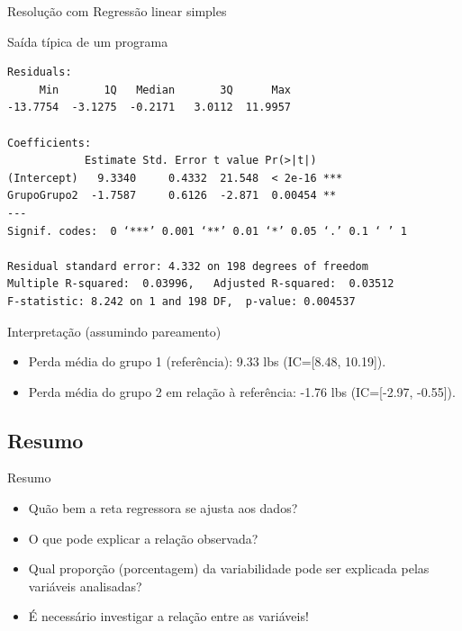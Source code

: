 \documentclass{beamer}
\begin{document}
\begin{frame}[fragile]{\small Resolução com Regressão linear simples}
  \begin{exampleblock}{Saída típica de um programa}
    \tiny
\begin{verbatim}
Residuals:
     Min       1Q   Median       3Q      Max 
-13.7754  -3.1275  -0.2171   3.0112  11.9957 

Coefficients:
            Estimate Std. Error t value Pr(>|t|)    
(Intercept)   9.3340     0.4332  21.548  < 2e-16 ***
GrupoGrupo2  -1.7587     0.6126  -2.871  0.00454 ** 
---
Signif. codes:  0 ‘***’ 0.001 ‘**’ 0.01 ‘*’ 0.05 ‘.’ 0.1 ‘ ’ 1

Residual standard error: 4.332 on 198 degrees of freedom
Multiple R-squared:  0.03996,	Adjusted R-squared:  0.03512 
F-statistic: 8.242 on 1 and 198 DF,  p-value: 0.004537
\end{verbatim}
  \end{exampleblock}
  \begin{exampleblock}{\small Interpretação (assumindo pareamento)}
    \begin{itemize}
      \scriptsize
    \item Perda média do grupo 1 (referência): 9.33 lbs {\tiny (IC=[8.48, 10.19])}.
    \item Perda média do grupo 2 em relação à referência: -1.76 lbs {\tiny (IC=[-2.97, -0.55])}.
    \end{itemize}
  \end{exampleblock}
\end{frame}

\subsection{Resumo}

\begin{frame}{Resumo}
  \begin{itemize}
  \item Quão bem a reta regressora se ajusta aos dados?
    \medskip
  \item O que pode explicar a relação observada?
    \medskip
  \item Qual proporção (porcentagem) da variabilidade pode ser
    explicada pelas variáveis analisadas?
    \medskip
  \item É necessário investigar a relação entre as variáveis!
  \end{itemize}
\end{frame}
\end{document}
